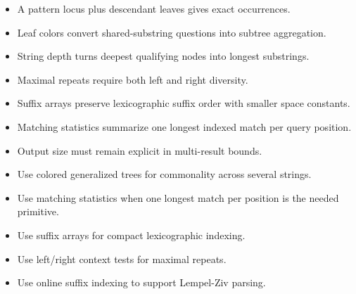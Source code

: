 \documentclass[11pt]{article}
\begin{document}
\begin{tcolorbox}[enhanced,breakable,title={Key takeaways},
  colback=white,colframe=Primary,fonttitle=\small\sffamily\bfseries,fontupper=\footnotesize,
  boxsep=0.6mm,left=1.5mm,right=1.5mm,top=1mm,bottom=1mm,before skip=3pt,after skip=3pt]
\begin{itemize}
  \item A pattern locus plus descendant leaves gives exact occurrences.
  \item Leaf colors convert shared-substring questions into subtree aggregation.
  \item String depth turns deepest qualifying nodes into longest substrings.
  \item Maximal repeats require both left and right diversity.
  \item Suffix arrays preserve lexicographic suffix order with smaller space constants.
  \item Matching statistics summarize one longest indexed match per query position.
  \item Output size must remain explicit in multi-result bounds.
\end{itemize}
\end{tcolorbox}

\begin{tcolorbox}[enhanced,breakable,title={Algorithm selection / when to use this},
  colback=Primary!3,colframe=Primary,fonttitle=\small\sffamily\bfseries,fontupper=\footnotesize,
  boxsep=0.6mm,left=1.5mm,right=1.5mm,top=1mm,bottom=1mm,before skip=3pt,after skip=3pt]
\begin{itemize}
  \item Use colored generalized trees for commonality across several strings.
  \item Use matching statistics when one longest match per position is the needed primitive.
  \item Use suffix arrays for compact lexicographic indexing.
  \item Use left/right context tests for maximal repeats.
  \item Use online suffix indexing to support Lempel-Ziv parsing.
\end{itemize}
\end{tcolorbox}
\end{document}
